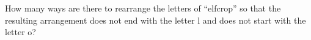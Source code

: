 How many ways are there to rearrange the letters of ``elfcrop'' so that the resulting arrangement does not end with the letter l and does not start with the letter o?
